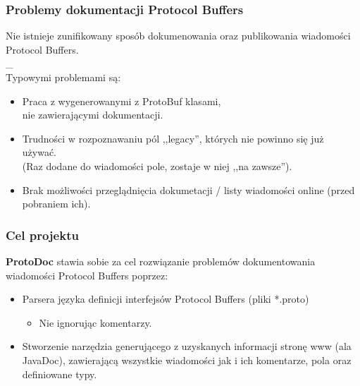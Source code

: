 \documentclass{beamer}
\begin{document}


\begin{frame}
\frametitle{Problemy dokumentacji Protocol Buffers}
Nie istnieje zunifikowany sposób dokumenowania oraz publikowania wiadomości Protocol Buffers. \\  
\_ \\ 

Typowymi problemami są:
 \begin{itemize}
  \pause \item Praca z wygenerowanymi z ProtoBuf klasami, \\
               nie zawierającymi dokumentacji.
  \pause \item Trudności w rozpoznawaniu pól ,,legacy'', których nie powinno się już używać. \\
               (Raz dodane do wiadomości pole, zostaje w niej ,,na zawsze'').
  \pause \item Brak możliwości przeglądnięcia dokumetacji / listy wiadomości online (przed pobraniem ich).
 \end{itemize}

\end{frame}



\begin{frame}
\frametitle{Cel projektu}

\textbf{ProtoDoc} stawia sobie za cel rozwiązanie problemów dokumentowania wiadomości Protocol Buffers poprzez:
\begin{itemize}
 \pause \item Parsera języka definicji interfejsów Protocol Buffers (pliki *.proto)
        \begin{itemize}
         \item Nie ignorując komentarzy.
        \end{itemize}

 \pause \item Stworzenie narzędzia generującego z uzyskanych informacji stronę www (ala JavaDoc), 
       zawierającą wszystkie wiadomości jak i ich komentarze, pola oraz definiowane typy.
\end{itemize}

\end{frame}

\end{document}
